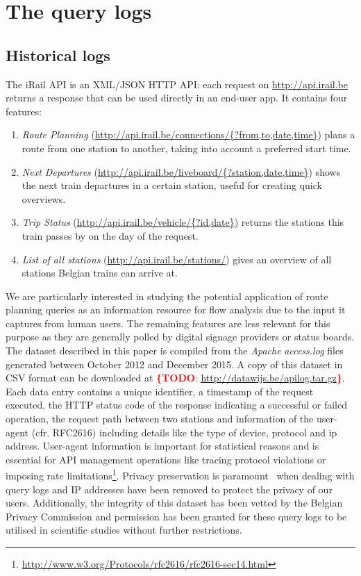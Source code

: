 \documentclass{sig-alternate}
\newcommand{\todo}[1]{\noindent\textcolor{red}{{\bf \{TODO}: #1{\bf \}}}}
\begin{document}
\section{The query logs}
\label{sec:logs}

\subsection{Historical logs}

The iRail API is an XML/JSON HTTP API: each request on \url{http://api.irail.be} returns a response that can be used directly in an end-user app.
It contains four features: 
\begin{enumerate}
\item \emph{Route Planning} (\url{http://api.irail.be/connections/{?from,to,date,time}}) plans a route from one station to another, taking into account a preferred start time.
\item \emph{Next Departures} (\url{http://api.irail.be/liveboard/{?station,date,time}}) shows the next train departures in a certain station, useful for creating quick overviews.
\item \emph{Trip Status} (\url{http://api.irail.be/vehicle/{?id,date}}) returns the stations this train passes by on the day of the request.
\item \emph{List of all stations} (\url{http://api.irail.be/stations/}) gives an overview of all stations Belgian trains can arrive at.
\end{enumerate}

We are particularly interested in studying the potential application of route planning queries as an information resource for flow analysis due to the input it captures from human users.
The remaining features are less relevant for this purpose as they are generally polled by digital signage providers or status boards.
The dataset described in this paper is compiled from the \emph{Apache} \emph{access.log} files generated between October 2012 and December 2015.
A copy of this dataset in CSV format can be downloaded at \todo{\url{http://datawijs.be/apilog.tar.gz}}.
Each data entry contains a unique identifier, a timestamp of the request executed, the HTTP status code of the response indicating a successful or failed operation, the request path between two stations and information of the user-agent (cfr. RFC2616) including details like the type of device, protocol and ip address.
User-agent information is important for statistical reasons and is essential for API management operations like tracing protocol violations or imposing rate limitations\footnote{\url{http://www.w3.org/Protocols/rfc2616/rfc2616-sec14.html}}. 
Privacy preservation is paramount~\cite{silvestri} when dealing with query logs and IP addresses have been removed to protect the privacy of our users. 
Additionally, the integrity of this dataset has been vetted by the Belgian Privacy Commission and permission has been granted for these query logs to be utilised in scientific studies without further restrictions.
\end{document}
